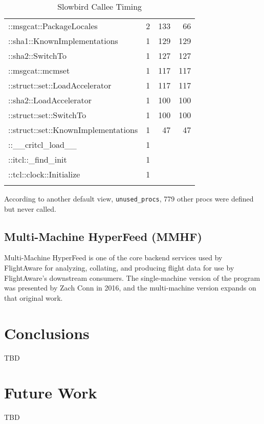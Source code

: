 \documentclass{article}[letter,10pt]
\begin{document}
{{{\begin{longtable}{l r r r}
          ::msgcat::PackageLocales & 2 & 133 & 66 \\
          ::sha1::KnownImplementations & 1 & 129 & 129 \\
          ::sha2::SwitchTo & 1 & 127 & 127 \\
          ::msgcat::mcmset & 1 & 117 & 117 \\
          ::struct::set::LoadAccelerator & 1 & 117 & 117 \\
          ::sha2::LoadAccelerator & 1 & 100 & 100 \\
          ::struct::set::SwitchTo & 1 & 100 & 100 \\
          ::struct::set::KnownImplementations & 1 & 47 & 47 \\
          ::\_\_critcl\_load\_\_ & 1 &  &  \\
          ::itcl::\_find\_init & 1 &  &  \\
          ::tcl::clock::Initialize & 1 &  & \\
          \bottomrule
          \caption{Slowbird Callee Timing}
          \label{tbl:slowbirdt}
        \end{longtable}
        According to another default view, \texttt{unused\_procs}, 779 other procs were defined but never called.

    }

    \subsection{Multi-Machine HyperFeed (MMHF)}{
      Multi-Machine HyperFeed is one of the core backend services used by FlightAware for analyzing, collating, and producing
      flight data for use by FlightAware's downstream consumers. The single-machine version of the program was presented
      by Zach Conn in 2016\autocite{hyperfeed}, and the multi-machine version expands on that original work.
    }

  }

}

\section{Conclusions}{
  TBD
}

\section{Future Work}{
  TBD
}

\printbibliography
\end{document}
